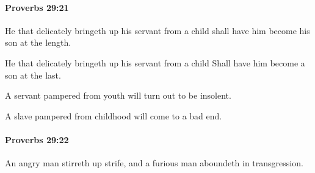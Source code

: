 		\paragraph{Proverbs 29:21} %
			\label{PROVERBS-29-21}

			He that delicately bringeth up his servant from a child shall have him become his son at the length.

			\begin{versebox}
					\item[BHS] 
					\item[ASV] He that delicately bringeth up his servant from a child Shall have him become a son at the last.
					\item[NIV] A servant pampered from youth will turn out to be insolent.
					\item[NRSV] A slave pampered from childhood will come to a bad end.
			\end{versebox}

		\paragraph{Proverbs 29:22} %
			\label{PROVERBS-29-22}

			An angry man stirreth up strife, and a furious man aboundeth in transgression.

